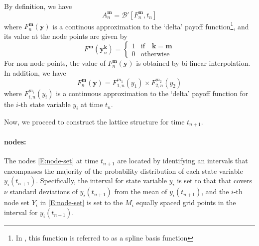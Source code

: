 \documentclass{texyise}
\newcommand{\valuebackward}{\mathcal{B}}
\begin{document}
By definition, we have
\begin{equation}
    A_{n}^{\bm{m}} = \valuebackward'[F_n^{\bm{m}}, t_n] \label{E:arrow-debreu-def}
\end{equation}
where $F_n^{\bm{m}}(\bm{y})$ is a continous approximation to the `delta' payoff function\footnote{In \cite{2fs-citi-mv}, this function is referred to as a spline basis function}, and its value at the node points are given by
\begin{equation}
    F^{\bm{m}}(\bm{y}_{n}^{\bm{k}}) = 
    \left\{
    \begin{array}{cl}
        1 & \text{if}\quad \bm{k} = \bm{m} \\
        0 & \text{otherwise}
    \end{array}
    \right.
    \label{E:delta-payoff}
\end{equation}
For non-node points, the value of $F_n^{\bm{m}}(\bm{y})$ is obtained by bi-linear interpolation. 
In addition, we have 
\begin{equation}
    F_n^{\bm{m}}(\bm{y}) = F_{1,n}^{m_1}(y_1) \times F_{2,n}^{m_2}(y_2)
\end{equation}
where $F_{i,n}^{m_i}(y_i)$ is a continuous approximation to the `delta' payoff function for the $i$-th state variable $y_i$ at time $t_n$.

Now, we proceed to construct the lattice structure for time $t_{n+1}$. 

\paragraph*{nodes:}

The nodes \eqref{E:node-set} at time $t_{n+1}$ are located by identifying an intervals that encompasses the majority of the probability distribution of each state variable $y_i(t_{n+1})$. Specifically, the interval for state variable $y_i$ is set to that that covers $\nu$ standard deviations of $y_i(t_{n+1})$ from the mean of $y_i(t_{n+1})$, and the $i$-th node set $Y_i$ in \eqref{E:node-set} is set to the $M_i$ equally spaced grid points in the interval for $y_i(t_{n+1})$.
\end{document}
